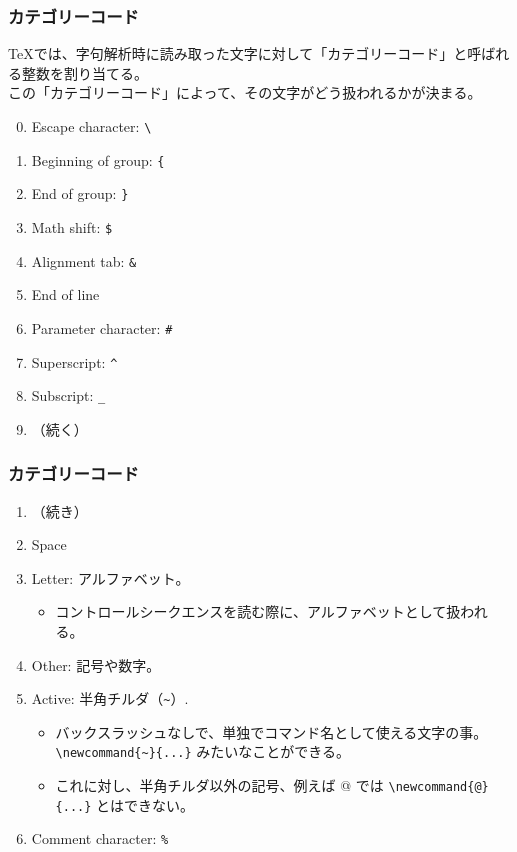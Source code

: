 \documentclass{beamer}
\begin{document}
\begin{frame}[fragile]\frametitle{カテゴリーコード}
  \TeX では、字句解析時に読み取った文字に対して「カテゴリーコード」と呼ばれる整数を割り当てる。 \\
  この「カテゴリーコード」によって、その文字がどう扱われるかが決まる。
  \begin{enumerate}
    \setcounter{enumi}{-1} %
  \item Escape character: \verb|\|
  \item Beginning of group: \verb|{|
  \item End of group: \verb|}|
  \item Math shift: \verb|$|
  \item Alignment tab: \verb|&|
  \item End of line
  \item Parameter character: \verb|#|
  \item Superscript: \verb|^|
  \item Subscript: \verb|_|
    \item[] （続く）
  \end{enumerate}
\end{frame}

\begin{frame}[fragile]\frametitle{カテゴリーコード}
  \begin{enumerate}
  \item[] （続き）
    \setcounter{enumi}{9}
  \item Space
  \item Letter: アルファベット。
    \begin{itemize}
    \item コントロールシークエンスを読む際に、アルファベットとして扱われる。
    \end{itemize}
  \item Other: 記号や数字。
  \item Active: 半角チルダ（\verb|~|）.
    \begin{itemize}
    \item バックスラッシュなしで、単独でコマンド名として使える文字の事。
      \verb|\newcommand{~}{...}| みたいなことができる。
    \item これに対し、半角チルダ以外の記号、例えば @ では \verb|\newcommand{@}{...}| とはできない。
    \end{itemize}
  \item Comment character: \verb|%|
  \end{enumerate}
\end{frame}
\end{document}
